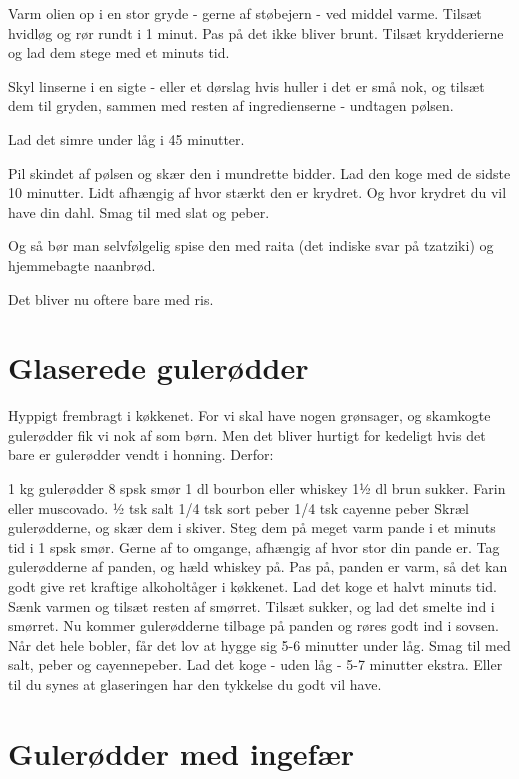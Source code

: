\documentclass[
]{book}
\begin{document}
Varm olien op i en stor gryde - gerne af støbejern - ved middel varme. Tilsæt hvidløg og rør rundt i 1 minut. Pas på det ikke bliver brunt. Tilsæt krydderierne og lad dem stege med et minuts tid.

Skyl linserne i en sigte - eller et dørslag hvis huller i det er små nok, og tilsæt dem til gryden, sammen med resten af ingredienserne - undtagen pølsen.

Lad det simre under låg i 45 minutter.

Pil skindet af pølsen og skær den i mundrette bidder. Lad den koge med de sidste 10 minutter. Lidt afhængig af hvor stærkt den er krydret. Og hvor krydret du vil have din dahl. Smag til med slat og peber.

Og så bør man selvfølgelig spise den med raita (det indiske svar på tzatziki) og hjemmebagte naanbrød.

Det bliver nu oftere bare med ris.

\section{Glaserede gulerødder}\label{glaserede-guleruxf8dder}

Hyppigt frembragt i køkkenet. For vi skal have nogen grønsager, og skamkogte gulerødder fik vi nok af som børn. Men det bliver hurtigt for kedeligt hvis det bare er gulerødder vendt i honning. Derfor:

1 kg gulerødder
8 spsk smør
1 dl bourbon eller whiskey
1½ dl brun sukker. Farin eller muscovado.
½ tsk salt
1/4 tsk sort peber
1/4 tsk cayenne peber
Skræl gulerødderne, og skær dem i skiver.
Steg dem på meget varm pande i et minuts tid i 1 spsk smør. Gerne af to omgange, afhængig af hvor stor din pande er.
Tag gulerødderne af panden, og hæld whiskey på. Pas på, panden er varm, så det kan godt give ret kraftige alkoholtåger i køkkenet. Lad det koge et halvt minuts tid. Sænk varmen og tilsæt resten af smørret.
Tilsæt sukker, og lad det smelte ind i smørret. Nu kommer gulerødderne tilbage på panden og røres godt ind i sovsen. Når det hele bobler, får det lov at hygge sig 5-6 minutter under låg.
Smag til med salt, peber og cayennepeber. Lad det koge - uden låg - 5-7 minutter ekstra. Eller til du synes at glaseringen har den tykkelse du godt vil have.

\section{Gulerødder med ingefær}\label{guleruxf8dder-med-ingefuxe6r}
\end{document}
